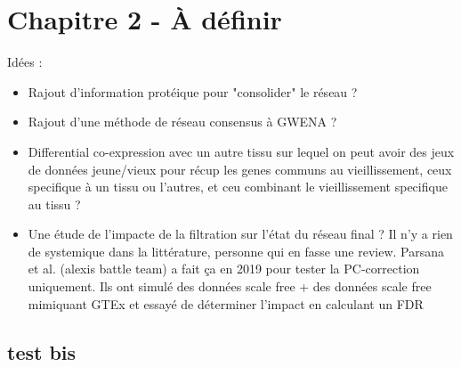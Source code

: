 \setcounter{chapter}{3}
\chapter*{Chapitre 2 - À définir}

Idées :
\begin{itemize}
    \item Rajout d'information protéique pour "consolider" le réseau ?
    \item Rajout d'une méthode de réseau consensus à GWENA ?
    \item Differential co-expression avec un autre tissu sur lequel on peut avoir des jeux de données jeune/vieux pour récup les genes communs au vieillissement, ceux specifique à un tissu ou l'autres, et ceu combinant le vieillissement specifique au tissu ?
    \item Une étude de l'impacte de la filtration sur l'état du réseau final ? Il n'y a rien de systemique dans la littérature, personne qui en fasse une review. Parsana et al. (alexis battle team) a fait ça en 2019 pour tester la PC-correction uniquement. Ils ont simulé des données scale free + des données scale free mimiquant GTEx et essayé de déterminer l'impact en calculant un FDR
\end{itemize}

\section{test bis}

